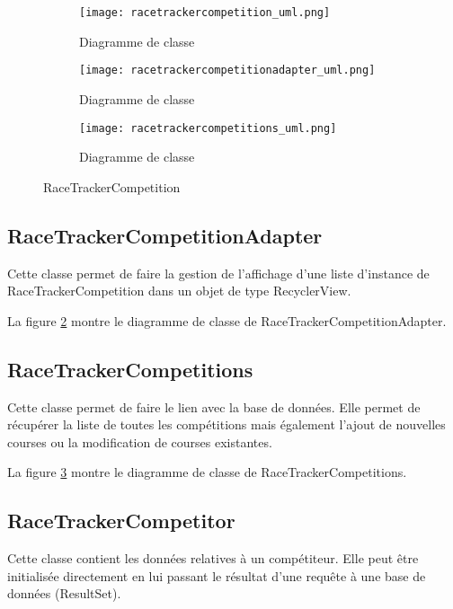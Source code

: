 \begin{figure}[htb!]
    \centering
    \begin{subfigure}[htb]{1\textwidth}
		\texttt{[image: racetrackercompetition\_uml.png]} 
		\caption{Diagramme de classe}
		\label{fig:racetrackercompetition_uml}
    \end{subfigure}
    \begin{subfigure}[htb]{1\textwidth}
		\texttt{[image: racetrackercompetitionadapter\_uml.png]} 
		\caption{Diagramme de classe}
		\label{fig:racetrackercompetitionadapter_uml}
    \end{subfigure}
    \begin{subfigure}[htb]{1\textwidth}
		\texttt{[image: racetrackercompetitions\_uml.png]} 
		\caption{Diagramme de classe}
		\label{fig:racetrackercompetitions_uml}
    \end{subfigure}
    \caption{RaceTrackerCompetition}\label{fig:racetrackercompetition_fig}
\end{figure}

\subsection{RaceTrackerCompetitionAdapter}

Cette classe permet de faire la gestion de l'affichage d'une liste d'instance de RaceTrackerCompetition dans un objet de type RecyclerView.

La figure \ref{fig:racetrackercompetitionadapter_uml} montre le diagramme de classe de RaceTrackerCompetitionAdapter.

\subsection{RaceTrackerCompetitions}

Cette classe permet de faire le lien avec la base de données. Elle permet de récupérer la liste de toutes les compétitions mais également l'ajout de nouvelles courses ou la modification de courses existantes.

La figure \ref{fig:racetrackercompetitions_uml} montre le diagramme de classe de RaceTrackerCompetitions.

\subsection{RaceTrackerCompetitor}

Cette classe contient les données relatives à un compétiteur. Elle peut être initialisée directement en lui passant le résultat d'une requête à une base de données (ResultSet).

